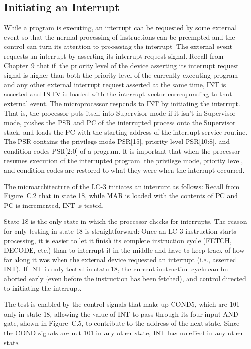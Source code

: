 \documentclass{patt}
\begin{document}
\subsection{Initiating an Interrupt}

While a program is executing, an interrupt can be requested by some
external event so that the normal processing of instructions can be
preempted and the control can turn its attention to processing the
interrupt.  The external event requests an interrupt by asserting its
interrupt request signal.  Recall from Chapter~9 that if~the priority
level of the device asserting its interrupt request signal is higher
than both the priority level of the currently executing program and any
other external interrupt request asserted at the same time, INT is
asserted and INTV is loaded with the interrupt vector corresponding to
that external event.
The microprocessor responds to INT by initiating the interrupt.  That
is, the processor puts itself into Supervisor mode if it isn't in Supervisor
mode, pushes the PSR and
PC of the interrupted process onto the \nobreak Supervisor stack, and loads the
PC with the starting address of the interrupt service routine.  The
PSR contains the privilege mode PSR[15], priority level PSR[10:8], and
condition codes PSR[2:0] of a program.  It is important that when the
processor resumes execution of the interrupted program, the privilege
mode, priority level, and condition codes are restored to what they
were when the interrupt occurred.

The microarchitecture of the LC-3 initiates an interrupt as follows:
Recall from Figure~C.2 that in state 18, while MAR is loaded with the
contents of PC and PC is incremented, INT is tested.

State 18 is the only state in which the processor checks for
interrupts.  The reason for only testing in state 18 is
straightforward: Once an LC-3 instruction starts processing, it is
easier to let it finish its complete instruction cycle (FETCH, DECODE,
etc.) than to interrupt it in the middle and have to keep track of how
far along it was when the external device requested an interrupt
(i.e., asserted INT).  If INT is only tested in state 18, the current
instruction cycle can be aborted early (even before the instruction
has been fetched), and control directed to initiating the interrupt.

The test is enabled by the control signals that make up COND5, which
are 101 only in state 18, allowing the value of INT to pass through
its four-input AND gate, shown in Figure~C.5, to contribute to the address 
of the next state.  Since the COND signals are not 101 in any other state, 
INT has no effect in any other state.
\end{document}
